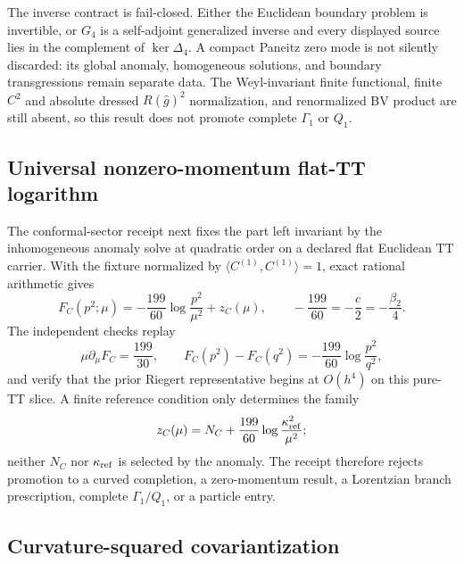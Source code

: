 \documentclass[11pt]{article}
\theoremstyle{definition}
\theoremstyle{remark}
\begin{document}
The inverse contract is fail-closed.  Either the Euclidean boundary problem
is invertible, or $G_4$ is a self-adjoint generalized inverse and every
displayed source lies in the complement of $\ker\Delta_4$.  A compact
Paneitz zero mode is not silently discarded: its global anomaly, homogeneous
solutions, and boundary transgressions remain separate data.  The
Weyl-invariant finite functional, finite $C^2$ and absolute dressed
$R(\widehat g)^2$ normalization, and renormalized BV product are still absent,
so this result does not promote complete $\Gamma_1$ or $Q_1$.

\subsection{Universal nonzero-momentum flat-TT logarithm}

The conformal-sector receipt next fixes the part left invariant by the
inhomogeneous anomaly solve at quadratic order on a declared flat Euclidean
TT carrier.  With the fixture normalized by
$\langle C^{(1)},C^{(1)}\rangle=1$, exact rational arithmetic gives
\[
 F_C(p^2;\mu)=-\frac{199}{60}\log\frac{p^2}{\mu^2}+z_C(\mu),
 \qquad
 -\frac{199}{60}=-\frac c2=-\frac{\beta_2}{4}.
\]
The independent checks replay
\[
 \mu\partial_\mu F_C=\frac{199}{30},
 \qquad
 F_C(p^2)-F_C(q^2)=-\frac{199}{60}\log\frac{p^2}{q^2},
\]
and verify that the prior Riegert representative begins at $O(h^4)$ on this
pure-TT slice.  A finite reference condition only determines the family
\[
 z_C(\mu)=N_C+\frac{199}{60}
 \log\frac{\kappa_{\rm ref}^2}{\mu^2};
\]
neither $N_C$ nor $\kappa_{\rm ref}$ is selected by the anomaly.  The receipt
therefore rejects promotion to a curved completion, a zero-momentum result,
a Lorentzian branch prescription, complete $\Gamma_1/Q_1$, or a particle
entry.

\subsection{Curvature-squared covariantization}
\end{document}
